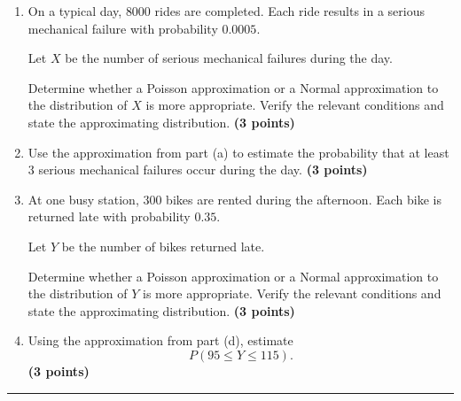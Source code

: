 \documentclass[11pt]{article}
\begin{document}
\begin{enumerate}[label=(\alph*),leftmargin=*,itemsep=0.9em]

    \item On a typical day, \(8000\) rides are completed. Each ride results
    in a serious mechanical failure with probability \(0.0005\).

    Let \(X\) be the number of serious mechanical failures during the day.

    Determine whether a Poisson approximation or a Normal approximation to
    the distribution of \(X\) is more appropriate. Verify the relevant
    conditions and state the approximating distribution.
    \hfill \textbf{(3 points)}

    \item Use the approximation from part (a) to estimate the probability
    that at least \(3\) serious mechanical failures occur during the day.
    \hfill \textbf{(3 points)}
 

    \item At one busy station, \(300\) bikes are rented during the afternoon.
    Each bike is returned late with probability \(0.35\).

    Let \(Y\) be the number of bikes returned late.

    Determine whether a Poisson approximation or a Normal approximation to
    the distribution of \(Y\) is more appropriate. Verify the relevant
    conditions and state the approximating distribution.
    \hfill \textbf{(3 points)}

    \item Using the approximation from part (d), estimate
    \[
    P(95\leq Y\leq115).
    \]
    \hfill \textbf{(3 points)}

\end{enumerate}
\hrule
 
\end{document}
